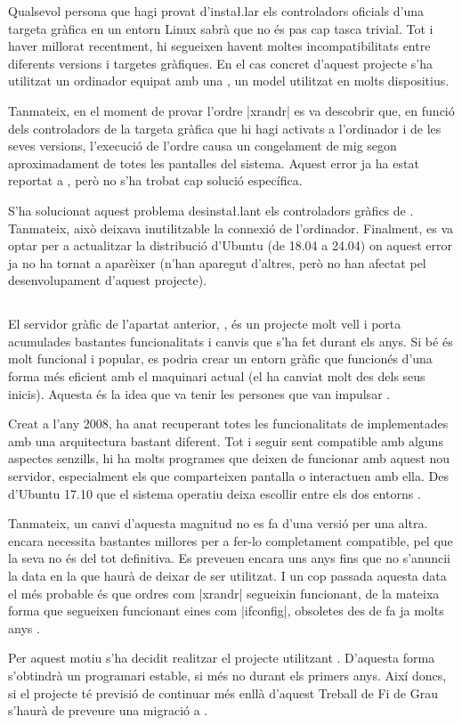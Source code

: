 Qualsevol persona que hagi provat d'insta\l.lar els controladors oficials
d'una targeta gràfica en un entorn Linux sabrà que no és pas cap tasca trivial.
Tot i haver millorat recentment, hi segueixen havent moltes incompatibilitats
entre diferents versions i targetes gràfiques. En el cas concret d'aquest
projecte s'ha utilitzat un ordinador equipat amb una ,
un model utilitzat en molts dispositius.

Tanmateix, en el moment de provar l'ordre \ord|xrandr| es va descobrir que,
en funció dels controladors de la targeta gràfica que hi hagi activats a
l'ordinador i de les seves versions, l'execució de l'ordre causa un congelament
de mig segon aproximadament de totes les pantalles del sistema. Aquest error ja
ha estat reportat a \cite{xrandrBug}, però no s'ha trobat cap solució
específica.

S'ha solucionat aquest problema desinsta\l.lant els controladors gràfics de
. Tanmateix, això deixava inutilitzable la connexió  de
l'ordinador. Finalment, es va optar per a actualitzar la distribució d'Ubuntu
(de 18.04 a 24.04) on aquest error ja no ha tornat a aparèixer (n'han aparegut
d'altres, però no han afectat pel desenvolupament d'aquest projecte).

\subsection{}
\label{subsec:wayland}

El servidor gràfic de l'apartat anterior, , és un projecte molt vell
i porta acumulades bastantes funcionalitats i canvis que s'ha fet durant els
anys. Si bé és molt funcional i popular, es podria crear un entorn gràfic que
funcionés d'una forma més eficient amb el maquinari actual (el 
ha canviat molt des dels seus inicis). Aquesta és la idea que va tenir les
persones que van impulsar .

Creat a l'any 2008, ha anat recuperant totes les funcionalitats de 
implementades amb una arquitectura bastant diferent. Tot i seguir sent
compatible amb alguns aspectes senzills, hi ha molts programes que deixen de
funcionar amb aquest nou servidor, especialment els que comparteixen pantalla
o interactuen amb ella. Des d'Ubuntu 17.10 que el sistema operatiu deixa
escollir entre els dos entorns \cite{Wayland}.

Tanmateix, un canvi d'aquesta magnitud no es fa d'una versió per una altra.
 encara necessita bastantes millores per a fer-lo completament
compatible, pel que la seva  no és del tot definitiva. Es preveuen
encara uns anys fins que no s'anuncii la data en la que  haurà de
deixar de ser utilitzat. I un cop passada aquesta data el més probable és que
ordres com \ord|xrandr| segueixin funcionant, de la mateixa forma que segueixen
funcionant eines com \ord|ifconfig|, obsoletes des de fa ja molts anys
\cite{Ifconfig}.

Per aquest motiu s'ha decidit realitzar el projecte utilitzant .
D'aquesta forma s'obtindrà un programari estable, si més no durant els primers
anys. Així doncs, si el projecte té previsió de continuar més enllà d'aquest
Treball de Fi de Grau s'haurà de preveure una migració a .
